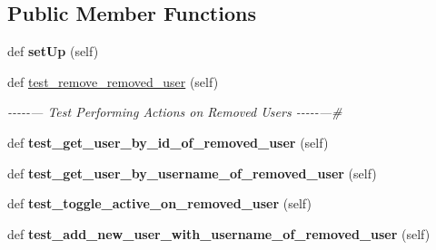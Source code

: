\subsection*{Public Member Functions}
\begin{DoxyCompactItemize}
\item 
\mbox{\label{classtests_1_1test__12__actions__on__removed__user_1_1_test_user_routes_a513e6836d609a1be0763bce545bfb4dc}} 
def {\bfseries set\+Up} (self)
\item 
\mbox{\label{classtests_1_1test__12__actions__on__removed__user_1_1_test_user_routes_a5456c2d048d6ba0dbf0fd307d32ed1f6}} 
def \hyperlink{classtests_1_1test__12__actions__on__removed__user_1_1_test_user_routes_a5456c2d048d6ba0dbf0fd307d32ed1f6}{test\+\_\+remove\+\_\+removed\+\_\+user} (self)
\begin{DoxyCompactList}\small\item\em -\/-\/-\/-\/-\/--- Test Performing Actions on Removed Users -\/-\/-\/-\/-\/---\# \end{DoxyCompactList}\item 
\mbox{\label{classtests_1_1test__12__actions__on__removed__user_1_1_test_user_routes_adb60a215f321ade2b888b9780a77088c}} 
def {\bfseries test\+\_\+get\+\_\+user\+\_\+by\+\_\+id\+\_\+of\+\_\+removed\+\_\+user} (self)
\item 
\mbox{\label{classtests_1_1test__12__actions__on__removed__user_1_1_test_user_routes_aeb21d672508405e8345054adcbff84f2}} 
def {\bfseries test\+\_\+get\+\_\+user\+\_\+by\+\_\+username\+\_\+of\+\_\+removed\+\_\+user} (self)
\item 
\mbox{\label{classtests_1_1test__12__actions__on__removed__user_1_1_test_user_routes_a432b564459a8b543060d2eacba543246}} 
def {\bfseries test\+\_\+toggle\+\_\+active\+\_\+on\+\_\+removed\+\_\+user} (self)
\item 
\mbox{\label{classtests_1_1test__12__actions__on__removed__user_1_1_test_user_routes_adaad7a7cdca8abdef556b2092cadbe28}} 
def {\bfseries test\+\_\+add\+\_\+new\+\_\+user\+\_\+with\+\_\+username\+\_\+of\+\_\+removed\+\_\+user} (self)
\end{DoxyCompactItemize}
